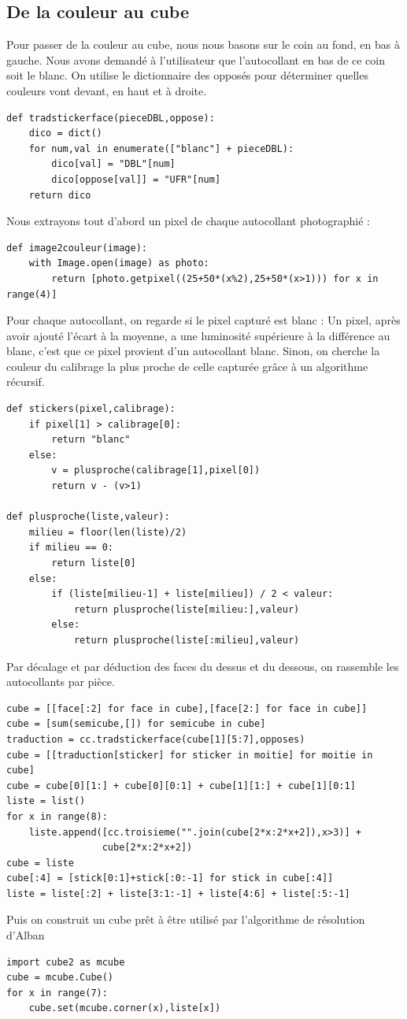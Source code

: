\documentclass[11pt,a4paper]{article}
\begin{document}
	\subsection{De la couleur au cube}
    Pour passer de la couleur au cube, nous nous basons sur le coin au fond, en bas à gauche. Nous avons demandé
à l'utilisateur que l'autocollant en bas de ce coin soit le blanc. On utilise le dictionnaire des opposés pour
déterminer quelles couleurs vont devant, en haut et à droite.
\begin{lstlisting}
def tradstickerface(pieceDBL,oppose):
    dico = dict()
    for num,val in enumerate(["blanc"] + pieceDBL):
        dico[val] = "DBL"[num]
        dico[oppose[val]] = "UFR"[num]
    return dico
\end{lstlisting}
Nous extrayons tout d'abord un pixel de chaque autocollant photographié :
\begin{lstlisting}
def image2couleur(image):
    with Image.open(image) as photo:
        return [photo.getpixel((25+50*(x%2),25+50*(x>1))) for x in range(4)]
\end{lstlisting}
Pour chaque autocollant, on regarde si le pixel capturé est blanc :
Un pixel, après avoir ajouté l'écart à la moyenne, a une luminosité supérieure à la différence au blanc,
c'est que ce pixel provient d'un autocollant blanc.
Sinon, on cherche la couleur du calibrage la plus proche de celle capturée grâce à un algorithme récursif.
\begin{lstlisting}
def stickers(pixel,calibrage):
    if pixel[1] > calibrage[0]:
        return "blanc"
    else:
        v = plusproche(calibrage[1],pixel[0])
        return v - (v>1)

def plusproche(liste,valeur):
    milieu = floor(len(liste)/2)
    if milieu == 0:
        return liste[0]
    else:
        if (liste[milieu-1] + liste[milieu]) / 2 < valeur:
            return plusproche(liste[milieu:],valeur)
        else:
            return plusproche(liste[:milieu],valeur)
\end{lstlisting}
Par décalage et par déduction des faces du dessus et du dessous, on rassemble les autocollants par pièce.
\begin{lstlisting}
cube = [[face[:2] for face in cube],[face[2:] for face in cube]]
cube = [sum(semicube,[]) for semicube in cube]
traduction = cc.tradstickerface(cube[1][5:7],opposes)
cube = [[traduction[sticker] for sticker in moitie] for moitie in cube]
cube = cube[0][1:] + cube[0][0:1] + cube[1][1:] + cube[1][0:1]
liste = list()
for x in range(8):
    liste.append([cc.troisieme("".join(cube[2*x:2*x+2]),x>3)] +
                 cube[2*x:2*x+2])
cube = liste
cube[:4] = [stick[0:1]+stick[:0:-1] for stick in cube[:4]]
liste = liste[:2] + liste[3:1:-1] + liste[4:6] + liste[:5:-1]
\end{lstlisting}
Puis on construit un cube prêt à être utilisé par l'algorithme de résolution d'Alban
\begin{lstlisting}
import cube2 as mcube
cube = mcube.Cube()
for x in range(7):
    cube.set(mcube.corner(x),liste[x])

\end{lstlisting}
\end{document}
